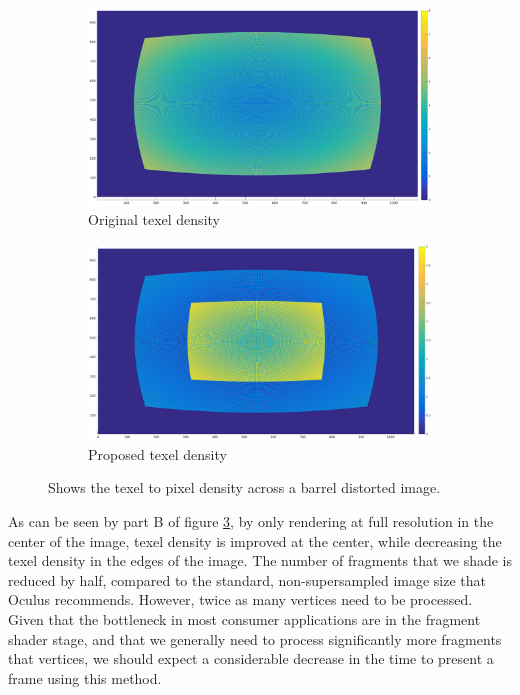 \documentclass[12pt,a4paper,twoside,openright]{report}
\begin{document}
\begin{figure}[tbh]

\begin{subfigure}{0.5\textwidth}
\includegraphics[width=1.2\linewidth]{figs/oculus_pixel_density.eps}
\caption{Original texel density}
\label{epsfig1}
\end{subfigure}
\begin{subfigure}{0.5\textwidth}
\includegraphics[width=1.2\linewidth]{figs/oculus_pixel_density_optimisation.eps}
\caption{Proposed texel density}
\label{epsfig1}
\end{subfigure}
 
\caption{Shows the texel to pixel density across a barrel distorted image.}
\label{fig:barreldensity}
\end{figure}

\begin{figure}
\end{figure}

As can be seen by part B of figure \ref{fig:barreldensity}, by only rendering at full resolution in the center of the image, texel density is improved at the center, while decreasing the texel density in the edges of the image. The number of fragments that we shade is reduced by half, compared to the standard, non-supersampled image size that Oculus recommends. However, twice as many vertices need to be processed. Given that the bottleneck in most consumer applications are in the fragment shader stage, and that we generally need to process significantly more fragments that vertices, we should expect a considerable decrease in the time to present a frame using this method. 
\end{document}
